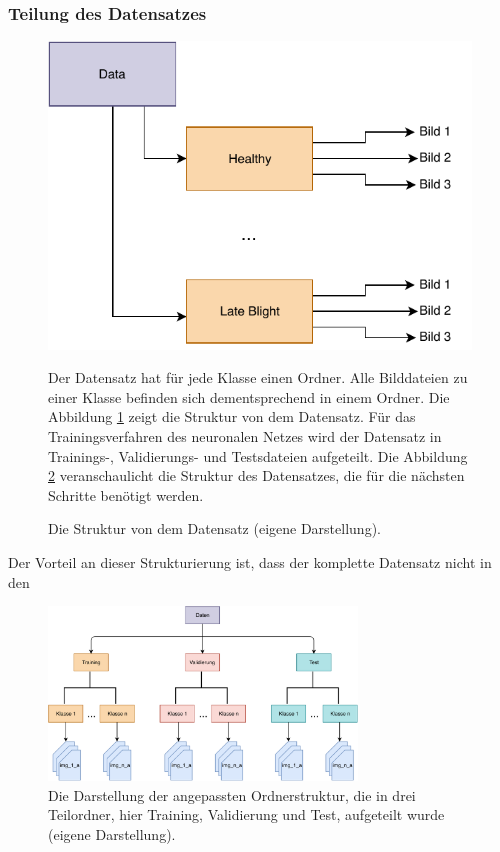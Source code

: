 \subsubsection{Teilung des Datensatzes}
\begin{figure}[!h]
	\begin{minipage}[c]{0.5\textwidth}
		\includegraphics[width=\textwidth]{bilder/original_structure}
		\caption{Die Struktur von dem Datensatz (eigene Darstellung).}
		\label{original_structure}
	\end{minipage}
	\hfill
	\begin{minipage}[c]{0.48\textwidth}
	Der Datensatz hat für jede Klasse einen Ordner. Alle Bilddateien zu einer Klasse befinden sich dementsprechend in einem Ordner. Die Abbildung \ref{original_structure} zeigt die Struktur von dem Datensatz. Für das Trainingsverfahren des neuronalen Netzes wird der Datensatz in Trainings-, Validierungs- und Testsdateien aufgeteilt. Die Abbildung \ref{flow_chart} veranschaulicht die Struktur des Datensatzes, die für die nächsten Schritte benötigt werden.
	\end{minipage}
\end{figure}


Der Vorteil an dieser Strukturierung ist, dass der komplette Datensatz nicht in den 
\begin{figure}[h!]
	\centering
	\includegraphics[width=0.73\textwidth]{bilder/flow_chart}
	\caption{Die Darstellung der angepassten Ordnerstruktur, die in drei Teilordner, hier Training, Validierung und Test, aufgeteilt wurde (eigene Darstellung).}
	\label{flow_chart}
\end{figure}

